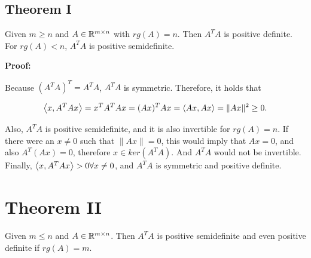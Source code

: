 \subsection{Theorem I}

Given \(m \ge n\) and \(A \in \mathbb{R}^{m \times n}\) with \(rg(A) = n\). Then \(A^T A\) is positive 
definite. For \(rg(A) < n\), \(A^T A\) is positive semidefinite.

\textbf{Proof:}

Because \((A^T A)^T = A^T A\), \(A^T A\) is symmetric. Therefore, it holds that 

\[
    \left\langle x, A^T A x\right\rangle = x^T A^T A x  = (Ax)^T Ax = \left\langle Ax, Ax\right\rangle = \|Ax\|^2 \ge 0.
\]

Also, \(A^T A\) is positive semidefinite, and it is also invertible for \(rg(A) = n\). If there were an 
\(x \ne 0\) such that \(\|Ax\| = 0\), this would imply that \(Ax = 0\), and also \(A^T (Ax) = 0\), therefore 
\(x \in ker(A^T A)\). And \(A^T A\) would not be invertible. Finally, 
\(\left\langle x, A^T Ax\right\rangle > 0 \forall x \ne 0\),  and \(A^T A\) is symmetric and positive definite.

\section{Theorem II}

Given \(m \le n\) and \(A \in \mathbb{R}^{m \times n}\). Then \(A^T A\) is positive semidefinite and even 
positive definite if \(rg(A) = m\).

